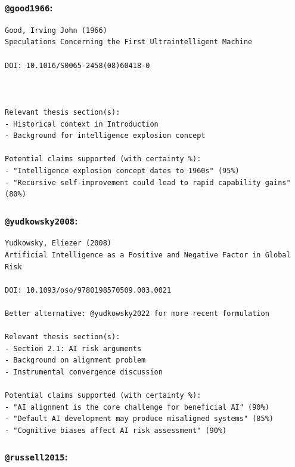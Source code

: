 \documentclass[
  11pt,
  letterpaper,
]{book}
\begin{document}
\subsubsection*{\texorpdfstring{\texttt{@good1966}:
\textcite{good1966}}{@good1966: @good1966}}\label{good1966-good1966}

\begin{verbatim}
Good, Irving John (1966)
Speculations Concerning the First Ultraintelligent Machine

DOI: 10.1016/S0065-2458(08)60418-0



Relevant thesis section(s):
- Historical context in Introduction
- Background for intelligence explosion concept

Potential claims supported (with certainty %):
- "Intelligence explosion concept dates to 1960s" (95%)
- "Recursive self-improvement could lead to rapid capability gains" (80%)
\end{verbatim}

\subsubsection*{\texorpdfstring{\texttt{@yudkowsky2008}:
\textcite{yudkowsky2008}}{@yudkowsky2008: @yudkowsky2008}}\label{yudkowsky2008-yudkowsky2008}

\begin{verbatim}
Yudkowsky, Eliezer (2008)
Artificial Intelligence as a Positive and Negative Factor in Global Risk

DOI: 10.1093/oso/9780198570509.003.0021

Better alternative: @yudkowsky2022 for more recent formulation

Relevant thesis section(s):
- Section 2.1: AI risk arguments
- Background on alignment problem
- Instrumental convergence discussion

Potential claims supported (with certainty %):
- "AI alignment is the core challenge for beneficial AI" (90%)
- "Default AI development may produce misaligned systems" (85%)
- "Cognitive biases affect AI risk assessment" (90%)
\end{verbatim}

\subsubsection*{\texorpdfstring{\texttt{@russell2015}:
\textcite{russell2015}}{@russell2015: @russell2015}}\label{russell2015-russell2015}
\end{document}
